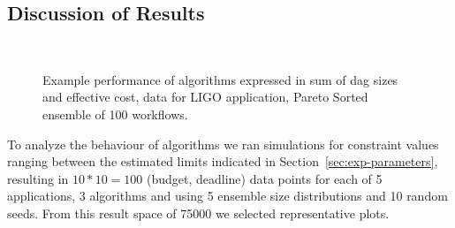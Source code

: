 \documentclass[conference]{IEEEtran}
\begin{document}
\subsection{Discussion of Results}


\begin{figure}[htb]
    \centering
    \\
    \caption{Example performance of algorithms expressed in
    sum of dag sizes and effective cost, data for LIGO application, Pareto
    Sorted ensemble of 100 workflows.}
    \label{fig:size-cost}
\end{figure}

To analyze the behaviour of algorithms we ran simulations for constraint values
ranging between the estimated limits indicated in Section~\ref{sec:exp-parameters},
resulting in $10 * 10 = 100$ (budget, deadline) data points for each of 5 applications, 3 algorithms and
using 5 ensemble size distributions and 10 random seeds. From this result space
of 75000 we selected representative plots.
\end{document}
